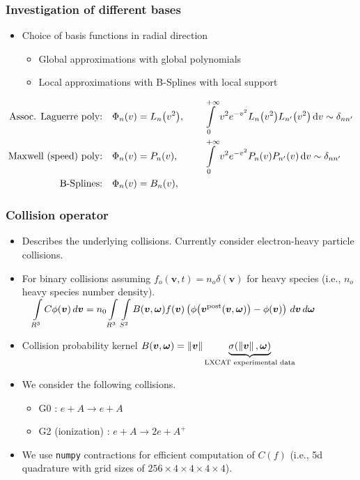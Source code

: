 \documentclass[mathserif, aspectratio=169]{beamer}
\newcommand{\ud}{\,\mathrm{d}}
\newcommand{\vect}[1]{\boldsymbol{#1}}
\newcommand{\of}[1]{\mleft( #1 \mright)}
\newcommand{\myint}{\int\limits}
\newcommand{\diff}[1]{\, d#1}
\newcommand{\norm}[1]{\left\lVert#1\right\rVert}
\begin{document}
\begin{frame}
	\frametitle{Investigation of different bases}
	\begin{itemize}
		\item Choice of basis functions in radial direction
		\begin{itemize}
			\item Global approximations with global polynomials
			\item Local approximations with B-Splines with local support 
		\end{itemize}
	\end{itemize}
		\small
		\begin{align*}
		\textrm{Assoc. Laguerre poly:}
		& \quad \Phi_n\of{v} = L_n\of{v^2}, &&
		\quad 
		\myint_{0}^{+\infty} v^2 e^{-v^2} L_n\of{v^2} L_{n^\prime}\of{v^2} \ud v \sim \delta_{nn^\prime}
		\\
		\textrm{Maxwell (speed) poly:}
		& \quad \Phi_n\of{v} = P_n\of{v}, &&
		\quad 
		\myint_{0}^{+\infty} v^2 e^{-v^2} P_n\of{v} P_{n^\prime}\of{v} \ud v \sim \delta_{nn^\prime}
		\\
		\textrm{B-Splines:}
		& \quad \Phi_n\of{v} = B_n\of{v}, &&
		\end{align*}	
\end{frame}

\begin{frame}[fragile]
	\frametitle{Collision operator}
	\begin{itemize}
		\item Describes the underlying collisions. Currently consider electron-heavy particle collisions. 
		\item For binary collisions assuming $f_o(\vect{v},t)=n_o \delta(\vect{v})$ for heavy species (i.e., $n_o$ heavy species number density). \\
		$	\displaystyle
			\quad
			\myint_{R^3}{} C \phi\of{\vect{v}} \diff{\vect{v}} 
			=
			n_0 \myint_{R^3}{} \myint_{S^2}{} 
			B\of{\vect{v}, \vect{\omega}} 
			f\of{\vect{v}}
			\left(
			\phi\of{\vect{v}^\text{post}\of{\vect{v},\vect{\omega}}} 
			- \phi\of{\vect{v}} 
			\right)
			\diff{\vect{v}} \diff{\vect{\omega}}$
		\item Collision probability kernel $B\of{\vect{v}, \vect{\omega}}=\norm{\vect{v}} \underbrace{\sigma(\norm{\vect{v}}, \vect{\omega})}_{\text{LXCAT experimental data}}$
		\item We consider the following collisions. 
		\begin{itemize}
			\item G0 : $e + A \rightarrow e + A$ 
			\item G2 (ionization) : $e + A \rightarrow 2e + A^+$ 
		\end{itemize}
		\item We use \texttt{numpy} contractions for efficient computation of $C(f)$ (i.e., 5d quadrature with grid sizes of $256\times 4\times 4 \times 4 \times 4$). 
	\end{itemize}
\end{frame}
\end{document}
